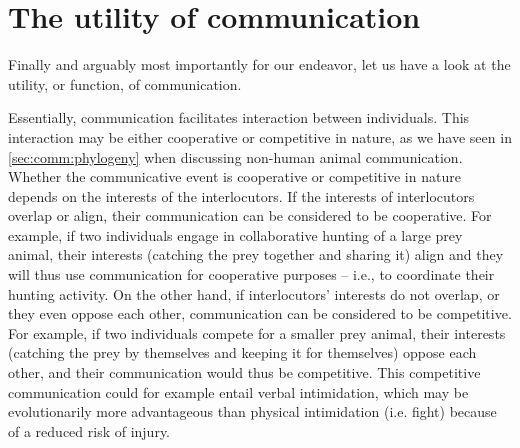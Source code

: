 \section{The utility of communication}
\label{sec:comm:function}

Finally and arguably most importantly for our endeavor, let us have a look at the utility, or function, of communication.

Essentially, communication facilitates interaction between individuals.
This interaction may be either cooperative or competitive in nature, as we have seen in \cref{sec:comm:phylogeny} when discussing non-human animal communication.
Whether the communicative event is cooperative or competitive in nature depends on the interests of the interlocutors. If the interests of interlocutors overlap or align, their communication can be considered to be cooperative.
For example, if two individuals engage in collaborative hunting of a large prey animal, their interests (catching the prey together and sharing it) align and they will thus use communication for cooperative purposes -- i.e., to coordinate their hunting activity.
On the other hand, if interlocutors' interests do not overlap, or they even oppose each other, communication can be considered to be competitive.
For example, if two individuals compete for a smaller prey animal, their interests (catching the prey by themselves and keeping it for themselves) oppose each other, and their communication would thus be competitive. This competitive communication could for example entail verbal intimidation, which may be evolutionarily more advantageous than physical intimidation (i.e. fight) because of a reduced risk of injury.

